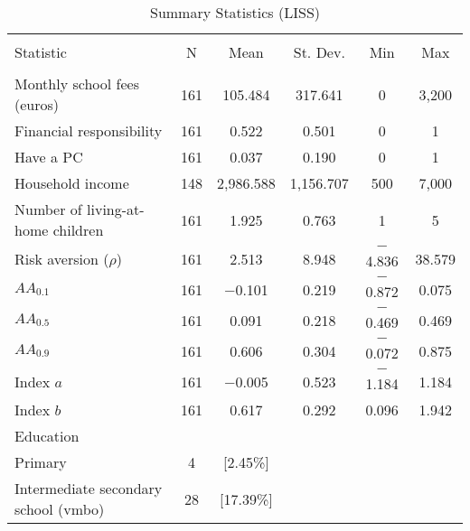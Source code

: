 
\begin{table}[!b] \centering 
  \caption{Summary Statistics (LISS)} 
  \label{tab:1} 
  \begin{threeparttable}

\begin{tabular}{@{\extracolsep{5pt}}lccccc} 
\\[-1.8ex]\hline 
\hline \\[-1.8ex] 
Statistic & \multicolumn{1}{c}{N} & \multicolumn{1}{c}{Mean} & \multicolumn{1}{c}{St. Dev.} & \multicolumn{1}{c}{Min} & \multicolumn{1}{c}{Max} \\ 
\hline \\[-1.8ex] 
\tnote{1}\hspace{3mm}Monthly school fees (euros) & 161 & 105.484 & 317.641 & 0 & 3,200 \\ 
\tnote{1}\hspace{3mm}Financial responsibility  & 161 & 0.522 & 0.501 & 0 & 1 \\ 
Have a PC & 161 & 0.037 & 0.190 & 0 & 1 \\ 
Household income & 148 & 2,986.588 & 1,156.707 & 500 & 7,000 \\ 
Number of living-at-home children & 161 & 1.925 & 0.763 & 1 & 5 \\
Risk aversion ($\rho$) & 161 & 2.513 & 8.948 & $-$4.836 & 38.579 \\ 
\tnote{2}\hspace{3mm}$AA_{0.1}$ & 161 & $-$0.101 & 0.219 & $-$0.872 & 0.075 \\ 
\tnote{2}\hspace{3mm}$AA_{0.5}$ & 161 & 0.091 & 0.218 & $-$0.469 & 0.469 \\ 
\tnote{2}\hspace{3mm}$AA_{0.9}$ & 161 & 0.606 & 0.304 & $-$0.072 & 0.875 \\ 
Index $a$ & 161 & $-$0.005 & 0.523 & $-$1.184 & 1.184 \\ 
Index $b$ & 161 & 0.617 & 0.292 & 0.096 & 1.942 \\ 
\tnote{3}\hspace{3mm}Education\\
\hspace{5mm} Primary& 4 & [2.45\%] && & \\
\hspace{5mm} Intermediate secondary school (vmbo) & 28 & [17.39\%] & & & \\

\end{tabular}
\end{threeparttable}
\end{table}
